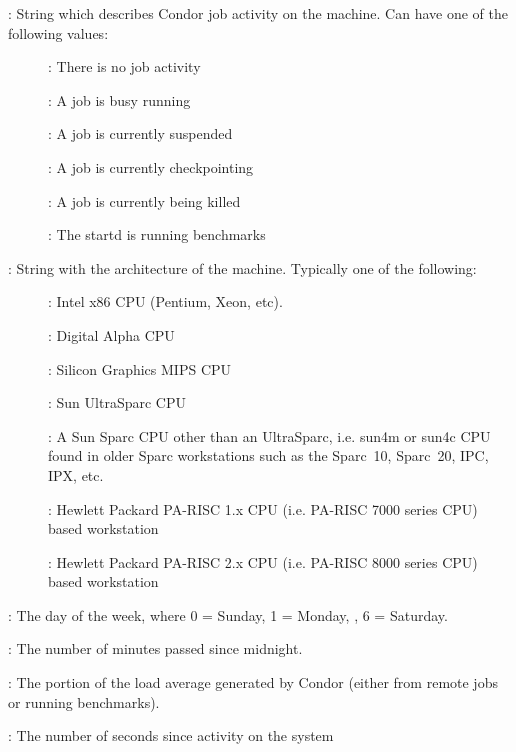 \begin{description}
%
\item[\AdAttr{Activity}] : String which describes Condor job activity on the machine.
Can have one of the following values:
	\begin{description}
	\item[] : There is no job activity
	\item[] : A job is busy running
	\item[] : A job is currently suspended
	\item[] : A job is currently checkpointing
	\item[] : A job is currently being killed
	\item[] : The startd is running benchmarks
	\end{description}
%
\item[\AdAttr{Arch}] : String with the architecture of the machine.  Typically
one of the following: 
	\begin{description}
	\item[] : Intel x86 CPU (Pentium, Xeon, etc).
	\item[] : Digital Alpha CPU
	\item[] : Silicon Graphics MIPS CPU
	\item[] : Sun UltraSparc CPU
	\item[] : A Sun Sparc CPU other than an UltraSparc, i.e.
sun4m or sun4c CPU found in older Sparc workstations such as the Sparc~10, 
Sparc~20, IPC, IPX, etc.
	\item[] :  Hewlett Packard PA-RISC 1.x CPU (i.e. PA-RISC    
                      7000 series CPU) based workstation
	\item[] :  Hewlett Packard PA-RISC 2.x CPU (i.e. PA-RISC    
                      8000 series CPU) based workstation
	\end{description}
%
\item[\AdAttr{ClockDay}] : The day of the week, where 0 = Sunday, 1 = Monday, \Dots, 6 = Saturday. 
%
\item[\AdAttr{ClockMin}] : The number of minutes passed since midnight.
%
\item[\AdAttr{CondorLoadAvg}] : The portion of the load average generated by Condor (either
from remote jobs or running benchmarks).
%
\item[\AdAttr{ConsoleIdle}] : The number of seconds since activity on the system

\end{description}
